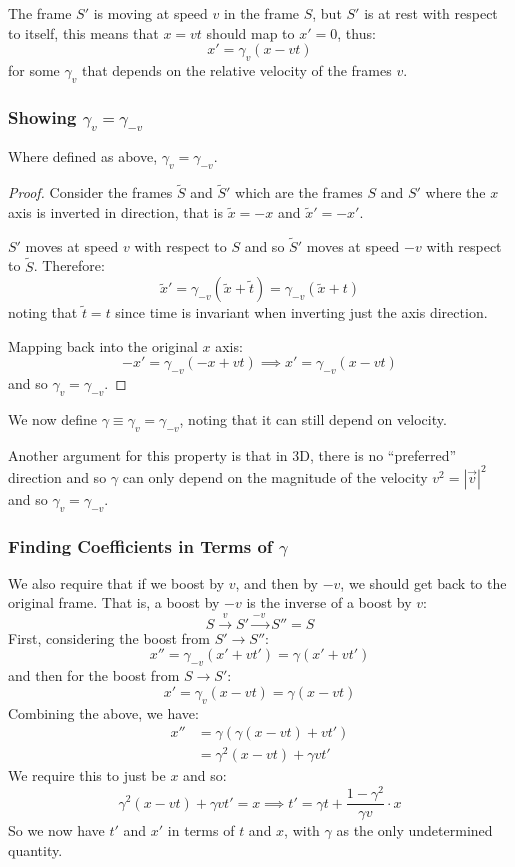 \documentclass[../main.tex]{subfiles}
\begin{document}
The frame $S'$ is moving at speed $v$ in the frame $S$, but $S'$ is at rest with respect to itself, this means that $x = vt$ should map to $x' = 0$, thus:
\[
  x' = \gamma_v(x - vt)
\]
for some $\gamma_v$ that depends on the relative velocity of the frames $v$.

\subsubsection{Showing $\gamma_v = \gamma_{-v}$}
\begin{lemma}
  Where defined as above, $\gamma_v = \gamma_{-v}$.
\end{lemma}
\begin{proof}
  Consider the frames $\widetilde{S}$ and $\widetilde{S}'$ which are the frames $S$ and $S'$ where the $x$ axis is inverted in direction, that is $\widetilde{x} = -x$ and $\widetilde{x}' = -x'$.

  $S'$ moves at speed $v$ with respect to $S$ and so $\widetilde{S}'$ moves at speed $-v$ with respect to $\widetilde{S}$.
  Therefore:
  \[
    \widetilde{x}' = \gamma_{-v}(\widetilde{x} + \widetilde{t}) = \gamma_{-v}(\widetilde{x} + t)
  \]
  noting that $\widetilde{t} = t$ since time is invariant when inverting just the axis direction.

  Mapping back into the original $x$ axis:
  \[
    -x' = \gamma_{-v}(-x + vt)  \implies x' = \gamma_{-v}(x - vt)
  \]
  and so $\gamma_{v} = \gamma_{-v}$.
\end{proof}
We now define $\gamma \equiv \gamma_{v} = \gamma_{-v}$, noting that it can still depend on velocity.
\begin{remark}
  Another argument for this property is that in 3D, there is no ``preferred'' direction and so $\gamma$ can only depend on the magnitude of the velocity $v^2 = |\vec{v}|^2$ and so $\gamma_v = \gamma_{-v}$.
\end{remark}
\subsubsection{Finding Coefficients in Terms of $\gamma$}
We also require that if we boost by $v$, and then by $-v$, we should get back to the original frame.
That is, a boost by $-v$ is the inverse of a boost by $v$:
\[
  S \xrightarrow{\ v\ } S' \xrightarrow{-v\ }S'' = S
\]
First, considering the boost from $S' \to S''$:
\[
  x'' = \gamma_{-v}(x' + vt') = \gamma(x' + vt')
\]
and then for the boost from $S \to S'$:
\[
  x' = \gamma_{v}(x - vt) = \gamma(x - vt)
\]
Combining the above, we have:
\begin{align*}
  x'' &= \gamma(\gamma(x - vt) + vt') \\
      &= \gamma^2 (x - vt) + \gamma vt'
\end{align*}
We require this to just be $x$ and so:
\[
  \gamma^2 (x - vt) + \gamma vt' = x \implies t' = \gamma t + \frac{1 - \gamma^2}{\gamma v} \cdot x
\]
So we now have $t'$ and $x'$ in terms of $t$ and $x$, with $\gamma$ as the only undetermined quantity.
\end{document}
